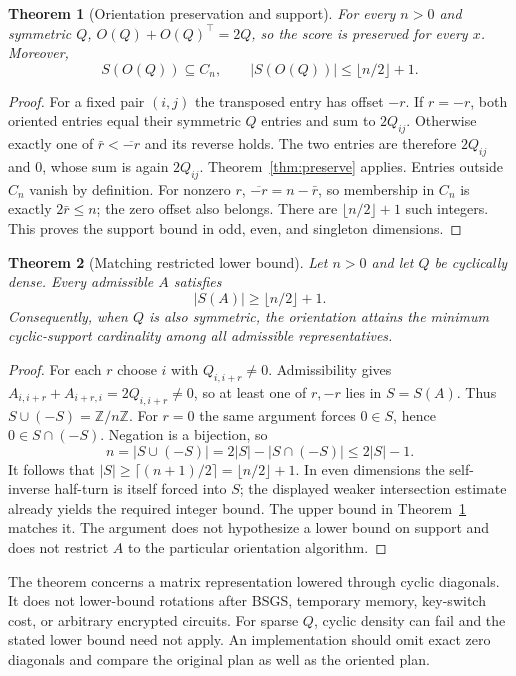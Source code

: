 \documentclass[10pt]{article}
\newtheorem{theorem}{Theorem}
\newcommand{\Zn}{\mathbb Z/n\mathbb Z}
\begin{document}
\begin{theorem}[Orientation preservation and support]\label{thm:upper}
For every $n>0$ and symmetric $Q$, $O(Q)+O(Q)^\top=2Q$, so the score is preserved for every $x$. Moreover,
\[
S(O(Q))\subseteq C_n,\qquad |S(O(Q))|\le\lfloor n/2\rfloor+1.
\]
\end{theorem}
\begin{proof}
For a fixed pair $(i,j)$ the transposed entry has offset $-r$. If $r=-r$, both oriented entries equal their symmetric $Q$ entries and sum to $2Q_{ij}$. Otherwise exactly one of $\bar r<\overline{-r}$ and its reverse holds. The two entries are therefore $2Q_{ij}$ and $0$, whose sum is again $2Q_{ij}$. Theorem~\ref{thm:preserve} applies. Entries outside $C_n$ vanish by definition. For nonzero $r$, $\overline{-r}=n-\bar r$, so membership in $C_n$ is exactly $2\bar r\le n$; the zero offset also belongs. There are $\lfloor n/2\rfloor+1$ such integers. This proves the support bound in odd, even, and singleton dimensions.
\end{proof}

\begin{theorem}[Matching restricted lower bound]\label{thm:lower}
Let $n>0$ and let $Q$ be cyclically dense. Every admissible $A$ satisfies
\[
|S(A)|\ge\lfloor n/2\rfloor+1.
\]
Consequently, when $Q$ is also symmetric, the orientation attains the minimum cyclic-support cardinality among all admissible representatives.
\end{theorem}
\begin{proof}
For each $r$ choose $i$ with $Q_{i,i+r}\ne0$. Admissibility gives
$A_{i,i+r}+A_{i+r,i}=2Q_{i,i+r}\ne0$, so at least one of $r,-r$ lies in $S=S(A)$. Thus $S\cup(-S)=\Zn$. For $r=0$ the same argument forces $0\in S$, hence $0\in S\cap(-S)$. Negation is a bijection, so
\[
n=|S\cup(-S)|=2|S|-|S\cap(-S)|\le2|S|-1.
\]
It follows that $|S|\ge\lceil(n+1)/2\rceil=\lfloor n/2\rfloor+1$. In even dimensions the self-inverse half-turn is itself forced into $S$; the displayed weaker intersection estimate already yields the required integer bound. The upper bound in Theorem~\ref{thm:upper} matches it. The argument does not hypothesize a lower bound on support and does not restrict $A$ to the particular orientation algorithm.
\end{proof}

The theorem concerns a matrix representation lowered through cyclic diagonals. It does not lower-bound rotations after BSGS, temporary memory, key-switch cost, or arbitrary encrypted circuits. For sparse $Q$, cyclic density can fail and the stated lower bound need not apply. An implementation should omit exact zero diagonals and compare the original plan as well as the oriented plan.
\end{document}
